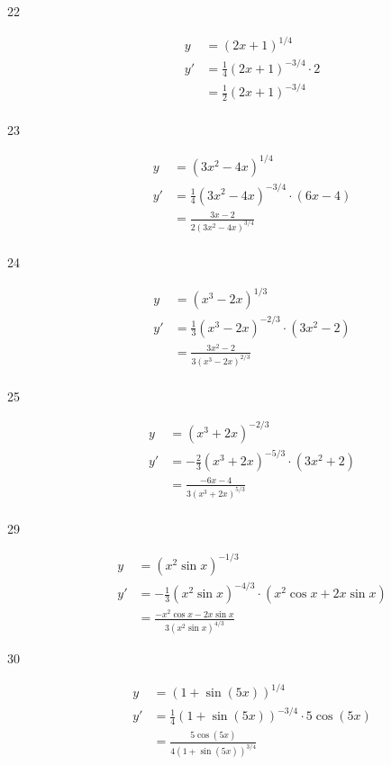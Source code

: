 \documentclass{exam}
\begin{document}
\begin{description}
\item[22]
\begin{align*}
  y &= (2x + 1)^{1/4} \\
  y' &= \frac{1}{4}(2x+1)^{-3/4} \cdot 2 \\
     &= \frac{1}{2} (2x+1)^{-3/4} \\
\end{align*}

\item[23]
\begin{align*}
  y  &= (3x^2 - 4x)^{1/4} \\
  y' &= \frac{1}{4} (3x^2 - 4x)^{-3/4} \cdot (6x - 4) \\
     &= \frac{3x - 2}{2(3x^2 - 4x)^{3/4}} \\
\end{align*}

\item[24]
\begin{align*}
  y  &= (x^3 - 2x)^{1/3} \\
  y' &= \frac{1}{3} (x^3 - 2x)^{-2/3} \cdot (3x^2 - 2) \\
     &= \frac{3x^2 - 2}{3(x^3 - 2x)^{2/3}} \\
\end{align*}

\item[25]
\begin{align*}
  y  &= (x^3 + 2x)^{-2/3} \\
  y' &= - \frac{2}{3} (x^3 + 2x)^{-5/3} \cdot (3x^2 + 2) \\
     &= \frac{-6x - 4}{3 (x^3 + 2x)^{5/3}}\\
\end{align*}

\item[29]
\begin{align*}
  y  &= (x^2 \sin x)^{-1/3} \\
  y' &= - \frac{1}{3} (x^2 \sin x)^{-4/3} \cdot (x^2 \cos x + 2x \sin x) \\
     &= \frac{-x^2 \cos x - 2x \sin x}{3 (x^2 \sin x)^{4/3}}
\end{align*}

\item[30]
\begin{align*}
  y  &= (1 + \sin(5x))^{1/4} \\
  y' &= \frac{1}{4} (1 + \sin(5x))^{-3/4} \cdot 5 \cos(5x) \\
     &= \frac{5 \cos(5x)}{4 (1 + \sin(5x))^{3/4}} \\
\end{align*}


\end{description}
\end{document}
